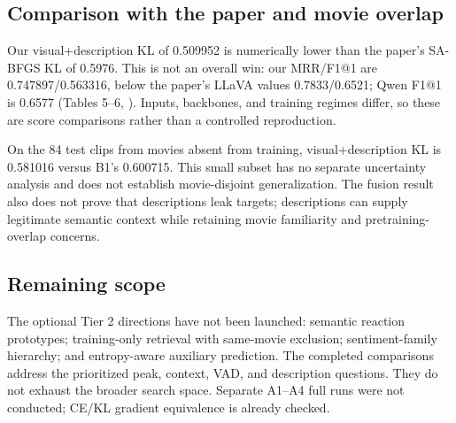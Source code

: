 

\subsection{Comparison with the paper and movie overlap}
Our visual+description KL of 0.509952 is numerically lower than the paper's SA-BFGS KL of 0.5976. This is not an overall win: our MRR/F1@1 are 0.747897/0.563316, below the paper's LLaVA values 0.7833/0.6521; Qwen F1@1 is 0.6577 (Tables 5--6, \cite{paper}). Inputs, backbones, and training regimes differ, so these are score comparisons rather than a controlled reproduction.

On the 84 test clips from movies absent from training, visual+description KL is 0.581016 versus B1's 0.600715. This small subset has no separate uncertainty analysis and does not establish movie-disjoint generalization. The fusion result also does not prove that descriptions leak targets; descriptions can supply legitimate semantic context while retaining movie familiarity and pretraining-overlap concerns.

\subsection{Remaining scope}
The optional Tier 2 directions have not been launched: semantic reaction prototypes; training-only retrieval with same-movie exclusion; sentiment-family hierarchy; and entropy-aware auxiliary prediction. The completed comparisons address the prioritized peak, context, VAD, and description questions. They do not exhaust the broader search space. Separate A1--A4 full runs were not conducted; CE/KL gradient equivalence is already checked.

